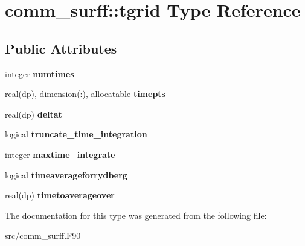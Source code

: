 \hypertarget{structcomm__surff_1_1tgrid}{}\section{comm\+\_\+surff\+:\+:tgrid Type Reference}
\label{structcomm__surff_1_1tgrid}
\subsection*{Public Attributes}
\begin{DoxyCompactItemize}
\item 
\mbox{\label{structcomm__surff_1_1tgrid_a6d810425996b13b4f9ee00df211f81a8}} 
integer {\bfseries numtimes}
\item 
\mbox{\label{structcomm__surff_1_1tgrid_aa29388224dae77a67a865f1b775e8333}} 
real(dp), dimension(\+:), allocatable {\bfseries timepts}
\item 
\mbox{\label{structcomm__surff_1_1tgrid_ad943dfdbc8f52016c4f13f186a5ba1d4}} 
real(dp) {\bfseries deltat}
\item 
\mbox{\label{structcomm__surff_1_1tgrid_a2d38e5a0229188fb1c2a56afe1abcebd}} 
logical {\bfseries truncate\+\_\+time\+\_\+integration}
\item 
\mbox{\label{structcomm__surff_1_1tgrid_a469cd7acb23d0bcf32f8f870241e67af}} 
integer {\bfseries maxtime\+\_\+integrate}
\item 
\mbox{\label{structcomm__surff_1_1tgrid_a177018456dc6b39f13de764a09ece1c9}} 
logical {\bfseries timeaverageforrydberg}
\item 
\mbox{\label{structcomm__surff_1_1tgrid_a31bee20d9f45037174c7f07efc57b186}} 
real(dp) {\bfseries timetoaverageover}
\end{DoxyCompactItemize}


The documentation for this type was generated from the following file\+:\begin{DoxyCompactItemize}
\item 
src/comm\+\_\+surff.\+F90\end{DoxyCompactItemize}
